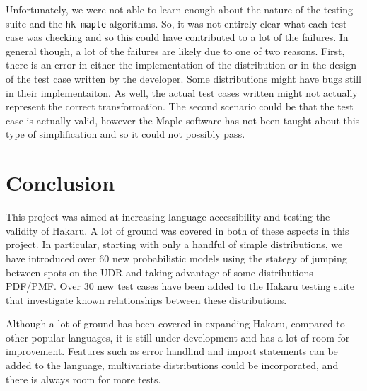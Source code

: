 \documentclass[11pt]{article}
\begin{document}
Unfortunately, we were not able to learn enough about the nature of the testing suite and the {\tt hk-maple} algorithms. So, it was not entirely clear what each test case was checking and so this could have contributed to a lot of the failures. In general though, a lot of the failures are likely due to one of two reasons. First, there is an error in either the implementation of the distribution or in the design of the test case written by the developer. Some distributions might have bugs still in their implementaiton. As well, the actual test cases written might not actually represent the correct transformation. The second scenario could be that the test case is actually valid, however the Maple software has not been taught about this type of simplification and so it could not possibly pass. 


\section{Conclusion}

\justifying

This project was aimed at increasing language accessibility and testing the validity of Hakaru. A lot of ground was covered in both of these aspects in this project. In particular, starting with only a handful of simple distributions, we have introduced over 60 new probabilistic models using the stategy of jumping between spots on the UDR and taking advantage of some distributions PDF/PMF. Over 30 new test cases have been added to the Hakaru testing suite that investigate known relationships between these distributions. 

Although a lot of ground has been covered in expanding Hakaru, compared to other popular languages, it is still under development and has a lot of room for improvement. Features such as error handlind and import statements can be added to the language, multivariate distributions could be incorporated, and there is always room for more tests. 


\newpage



\newpage
\appendix
\end{document}
